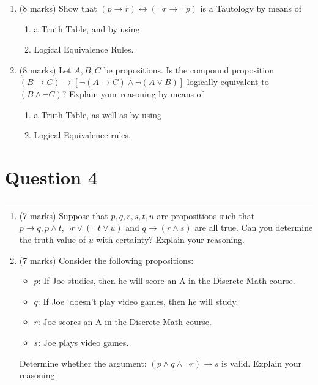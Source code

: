 \documentclass{article}
\begin{document}
\begin{enumerate}[label=\alph*.]
    \item (8 marks) Show that \( (p \to r) \leftrightarrow (\neg r \to \neg p) \) is a Tautology by means of
          \begin{enumerate}[label=\roman*.]
              \item a Truth Table, and by using
              \item Logical Equivalence Rules.
          \end{enumerate}
    \item (8 marks) Let \( A, B, C \) be propositions. Is the compound proposition \( (B \to C) \to [\neg (A \to C) \land \neg (A \lor B)] \) logically equivalent to \( (B \land \neg C) \)? Explain your reasoning by means of
          \begin{enumerate}[label=\roman*.]
              \item a Truth Table, as well as by using
              \item Logical Equivalence rules.
          \end{enumerate}
\end{enumerate}



\section*{Question 4}
\hrule
\vspace{0.5cm}

\begin{enumerate}[label=\alph*.]
    \item (7 marks) Suppose that \( p, q, r, s, t, u \) are propositions such that \( p \to q, p \land t, \neg r \lor (\neg t \lor u) \) and \( q \to (r \land s) \) are all true. Can you determine the truth value of \( u \) with certainty? Explain your reasoning.
    \item (7 marks) Consider the following propositions:
          \begin{itemize}
              \item \( p \): If Joe studies, then he will score an A in the Discrete Math course.
              \item \( q \): If Joe `doesn’t play video games, then he will study.
              \item \( r \): Joe scores an A in the Discrete Math course.
              \item \( s \): Joe plays video games.
          \end{itemize}
          Determine whether the argument: \( (p \land q \land \neg r) \to s \) is valid. Explain your reasoning.
\end{enumerate}
\end{document}
